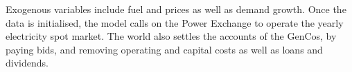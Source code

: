 Exogenous variables include fuel and  prices as well as demand growth. Once the data is initialised, the model calls on the Power Exchange to operate the yearly electricity spot market. The world also settles the accounts of the GenCos, by paying bids, and removing operating and capital costs as well as loans and dividends.

















